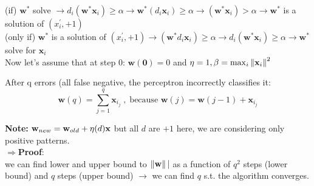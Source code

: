 \documentclass[../main.tex]{subfiles}
\begin{document}
\noindent(if) $\mathbf{w^*}$ solve $\rightarrow d_i(\mathbf{w^*}\mathbf{x}_i) \geq \alpha \rightarrow \mathbf{w^*}(d_i\mathbf{x}_i) \geq \alpha \rightarrow (\mathbf{w^*}\mathbf{x}_i) > \alpha \rightarrow \mathbf{w}^*$ is a solution of $(x^{'}_{i}, +1)$\\
(only if)  $\mathbf{w^*}$ is a solution of $(x^{'}_{i}, +1) \rightarrow (\mathbf{w^*}d_i\mathbf{x}_i) \geq \alpha \rightarrow  d_i(\mathbf{w^*}\mathbf{x}_i) \geq \alpha \rightarrow \mathbf{w^*}$ solve for $\mathbf{x}_i$\\

Now let's assume that at step $0$: $\mathbf{w(0)} = 0$ and $\eta = 1, \beta = \max_i \left\lVert\mathbf{x}_i\right\rVert^2$

After q errors (all false negative, the perceptron incorrectly classifies it:
$$\mathbf{w}(q) = \sum_{j=1}^{q} \mathbf{x}_{i_j} \;,\; \text{because } \mathbf{w}(j) = \mathbf{w}(j-1) + \mathbf{x}_{i_j}$$

\textbf{Note:} $\bold{w}_{new} = \bold{w}_{old} + \eta (d)\bold{x}$ but all $d$ are $+1$ here, we are considering only positive patterns.\\

\noindent$\Rightarrow$\textbf{Proof}:\\
we can find lower and upper bound to $\left\lVert\mathbf{w}\right\rVert|$ as a function of $q^2$ steps (lower bound) and $q$ steps (upper bound) $\rightarrow$ we can find $q$ s.t. the
algorithm converges.
\end{document}

